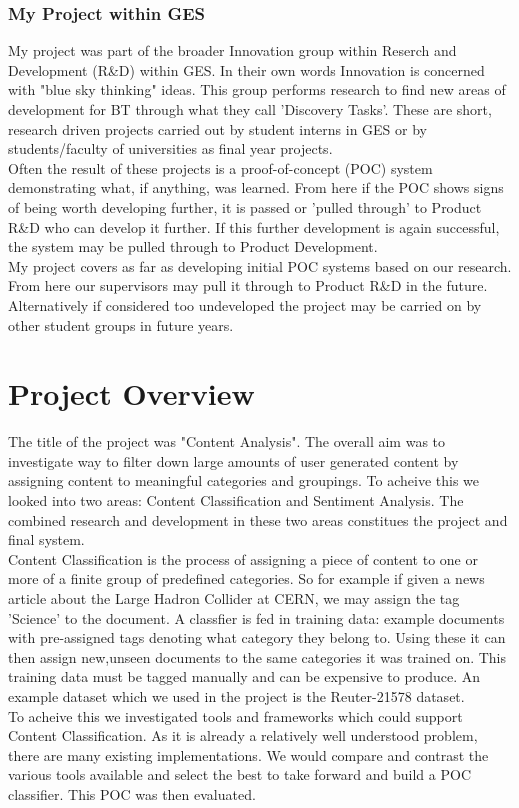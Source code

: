 \documentclass[a4paper,11pt]{report}
\begin{document}
\subsection{My Project within GES}
My project was part of the broader Innovation group within Reserch and Development (R\&D) within GES. In their own words Innovation is concerned with  "blue sky thinking" ideas. This group performs research to find new areas of development for BT through what they call 'Discovery Tasks'. These are short, research driven projects carried out by student interns in GES or by students/faculty of universities as final year projects.\\
Often the result of these projects is a proof-of-concept (POC) system demonstrating what, if anything, was learned. From here if the POC shows signs of being worth developing further, it is passed or 'pulled through' to Product R\&D who can develop it further. If this further development is again successful, the system may be pulled through to Product Development.\\
My project covers as far as developing initial POC systems based on our research. From here our supervisors may pull it through to Product R\&D in the future. Alternatively if considered too undeveloped the project may be carried on by other student groups in future years.

\chapter{Project Overview}
The title of the project was "Content Analysis". The overall aim was to investigate way  to filter down large amounts of user generated content by assigning content to meaningful categories and groupings. To acheive this we looked into two areas: Content Classification and Sentiment Analysis. The combined research and development in these two areas constitues the project and final system.\\
Content Classification is the process of assigning a piece of content to one or more of a finite group of predefined categories. So for example if given a news article about the Large Hadron Collider at CERN, we may assign the tag 'Science' to the document. A classfier is fed in training data: example documents with pre-assigned tags denoting what category they belong to. Using these it can then assign new,unseen documents to the same categories it was trained on. This training data must be tagged manually and can be expensive to produce. An example dataset which we used in the project is the Reuter-21578 dataset.\\
To acheive this we investigated tools and frameworks which could support Content Classification. As it is already a relatively well understood problem, there are many existing implementations. We would compare and contrast the various tools available and select the best to take forward and build a POC classifier. This POC was then evaluated.\\
\end{document}
